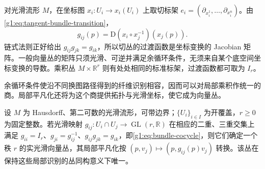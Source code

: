 \begin{example}
	\label{g1:exm:tangent-bundle-transition-functions}
	对光滑流形 \(M\)，在坐标图 \(x_i:U_i\to x_i(U_i)\) 上取切标架 \(e_i=(\partial_{x_i^1},\ldots,\partial_{x_i^n})\)。由\eqref{g1:eq:tangent-bundle-transition}，
	\[
		g_{ij}(p)=\mathrm{D}(x_i\circ x_j^{-1})(x_j(p)).
	\]
	链式法则正好给出 \(g_{ij}g_{jk}=g_{ik}\)，所以切丛的过渡函数是坐标变换的 Jacobian 矩阵。一般向量丛的矩阵只须光滑、可逆并满足余循环条件，无须来自某个底空间坐标变换的导数。乘积丛 \(M\times\mathbb R^r\) 则有处处相同的标准标架，过渡函数都可取为 \(I_r\)。
\end{example}

余循环条件使沿不同换图路径得到的纤维识别相容，因而可以对局部乘积作统一的商。局部平凡化还将为这个商提供拓扑与光滑坐标，使它成为向量丛。

\begin{theorem}
	\label{g1:thm:bundle-cocycle-gluing}
	设 \(M\) 为 Hausdorff、第二可数的光滑流形，可带边界；\(\{U_i\}_{i\in I}\) 为开覆盖，\(r\geq0\) 为固定整数。若光滑映射 \(g_{ij}:U_i\cap U_j\to\operatorname{GL}(r,\mathbb R)\) 在相应的二重、三重交集上满足 \(g_{ii}=I_r\)、\(g_{ji}=g_{ij}^{-1}\)、\(g_{ij}g_{jk}=g_{ik}\)，即\eqref{g1:eq:bundle-cocycle}，则它们确定一个秩 \(r\) 的实光滑向量丛，其局部平凡化按 \((p,v_j)\mapsto(p,g_{ij}(p)v_j)\) 转换。该丛在保持这些局部识别的丛同构意义下唯一。
\end{theorem}
